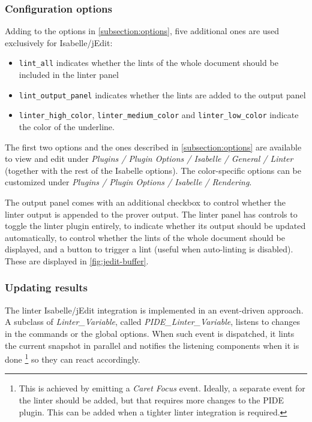 \subsubsection{Configuration options}
Adding to the options in \autoref{subsection:options}, five additional
ones are used exclusively for Isabelle/jEdit:
\begin{itemize}
    \item \texttt{lint\_all} indicates whether the lints of the
    whole document should be included in the linter panel
    \item \texttt{lint\_output\_panel} indicates whether the lints are
    added to the output panel
    \item \texttt{linter\_high\_color}, \texttt{linter\_medium\_color} 
    and \texttt{linter\_low\_color} indicate the color of the
    underline.
\end{itemize}

The first two options and the ones described in
\autoref{subsection:options} are available to view and edit  under 
\textit{Plugins / Plugin Options / Isabelle / General / Linter} (together
with the rest of the Isabelle options). The color-specific options can be
customized under \textit{Plugins / Plugin Options / Isabelle / 
Rendering}.

The output panel comes with an additional checkbox to control whether
the linter output is appended to the prover output. The linter panel
has controls to toggle the linter plugin entirely, to indicate whether
its output should be updated automatically, to control whether the
lints of the whole document should be displayed, and a button to trigger
a lint (useful when auto-linting is disabled). These are displayed in
\autoref{fig:jedit-buffer}.

\subsubsection{Updating results}

The linter Isabelle/jEdit integration is implemented in an 
event-driven approach. A subclass of \textit{Linter\_Variable}, called
\textit{PIDE\_Linter\_Variable}, listens to changes in the commands
or the global options. When such event is dispatched, it lints
the current snapshot in parallel
and notifies the listening components
when it is done \footnote{This is achieved by emitting a 
\textit{Caret Focus} event. Ideally, a separate event for the linter
should be added, but that requires more changes to the PIDE plugin. This
can be added when a tighter linter integration is required.}
so they can react accordingly.

